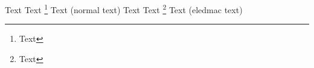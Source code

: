\documentclass{book}
\begin{document}
Text Text%
    \footnote{Text}
Text (normal text)
\beginnumbering
\pstart
Text Text%
    \footnote{Text}
Text (eledmac text)
\pend
\endnumbering
\end{document}
